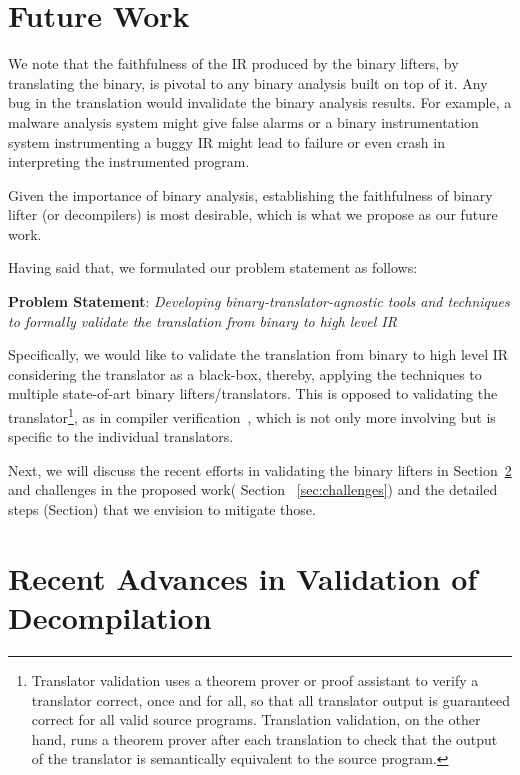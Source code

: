 \section{Future Work}\label{sec:problem}

We note that the faithfulness of the IR produced by the binary lifters, by
translating the binary, is pivotal to any binary analysis built on top of it.
Any bug in the translation would invalidate the binary analysis results. For
example, a malware analysis system might give false alarms or a binary
instrumentation system instrumenting a buggy IR might lead to failure or even
crash in interpreting the instrumented program. 

Given the importance of binary analysis, establishing the faithfulness of
binary lifter (or decompilers) is most desirable, which is what we propose as
our future work.

Having said that, we formulated our problem statement as follows:

\vspace{10pt}

\noindent\textbf{Problem Statement}: \emph{Developing binary-translator-agnostic tools and techniques to formally  
    validate the translation from binary to high level IR}

Specifically, we would like to validate the translation from binary to high
level IR considering the translator as a black-box, thereby, applying the
techniques to multiple state-of-art binary lifters/translators. This is
opposed to validating the translator\footnote{Translator validation uses a
  theorem prover or proof assistant to verify a translator correct, once and
    for all, so that all translator output is guaranteed correct for all valid
      source programs. Translation validation, on the other hand, runs a
        theorem prover after each translation to check that the output of the
        translator is semantically equivalent to the source program.}, as
         in  compiler verification~\cite{Leroy:2009}, which
        is not only more involving but is specific to the individual
        translators.

Next, we will discuss the recent efforts in validating the binary lifters in
Section~\ref{sec:recent-advances} and challenges in the proposed work( Section
    ~\ref{sec:challenges}) and the detailed steps (Section) that we envision to
mitigate those.

\section{Recent Advances in Validation of Decompilation}\label{sec:recent-advances}

